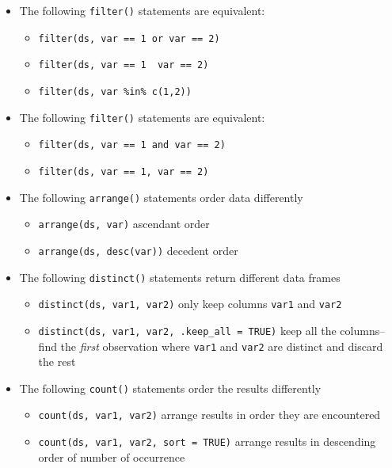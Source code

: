 \documentclass[
  letterpaper,
  DIV=11,
  numbers=noendperiod]{scrreprt}
\providecommand{\tightlist}{%
  \setlength{\itemsep}{0pt}\setlength{\parskip}{0pt}}\usepackage{longtable,booktabs,array}
\begin{document}
\begin{itemize}
\tightlist
\item
  The following \texttt{filter()} statements are equivalent:

  \begin{itemize}
  \tightlist
  \item
    \texttt{filter(ds,\ var\ ==\ 1\ or\ var\ ==\ 2)}
  \item
    \texttt{filter(ds,\ var\ ==\ 1\ \textbar{}\ var\ ==\ 2)}
  \item
    \texttt{filter(ds,\ var\ \%in\%\ c(1,2))}
  \end{itemize}
\item
  The following \texttt{filter()} statements are equivalent:

  \begin{itemize}
  \tightlist
  \item
    \texttt{filter(ds,\ var\ ==\ 1\ and\ var\ ==\ 2)}
  \item
    \texttt{filter(ds,\ var\ ==\ 1,\ var\ ==\ 2)}
  \end{itemize}
\item
  The following \texttt{arrange()} statements order data differently

  \begin{itemize}
  \tightlist
  \item
    \texttt{arrange(ds,\ var)} ascendant order
  \item
    \texttt{arrange(ds,\ desc(var))} decedent order
  \end{itemize}
\item
  The following \texttt{distinct()} statements return different data
  frames

  \begin{itemize}
  \tightlist
  \item
    \texttt{distinct(ds,\ var1,\ var2)} only keep columns \texttt{var1}
    and \texttt{var2}
  \item
    \texttt{distinct(ds,\ var1,\ var2,\ .keep\_all\ =\ TRUE)} keep all
    the columns--find the \emph{first} observation where \texttt{var1}
    and \texttt{var2} are distinct and discard the rest
  \end{itemize}
\item
  The following \texttt{count()} statements order the results
  differently

  \begin{itemize}
  \tightlist
  \item
    \texttt{count(ds,\ var1,\ var2)} arrange results in order they are
    encountered
  \item
    \texttt{count(ds,\ var1,\ var2,\ sort\ =\ TRUE)} arrange results in
    descending order of number of occurrence
  \end{itemize}
\end{itemize}
\end{document}
